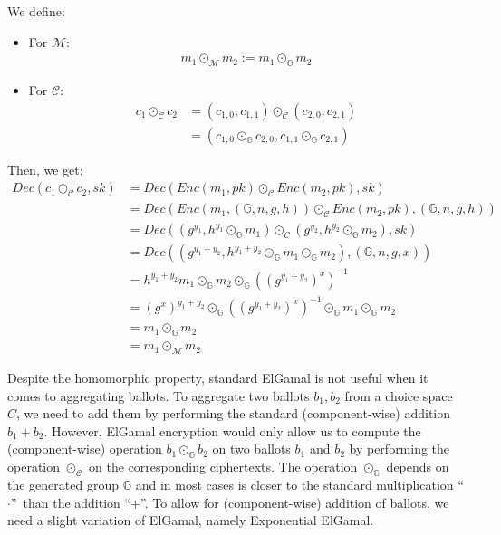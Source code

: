We define:
\begin{itemize}
    \item For $\mathcal{M}$:
    \begin{align*}
        m_1\odot_{\mathcal{M}}m_2 := m_1 \odot_{\mathbb{G}} m_2
    \end{align*}
    \item For $\mathcal{C}$:
    \begin{align*}
        c_1\odot_{\mathcal{C}}c_2 &= (c_{1,0}, c_{1,1})\odot_\mathcal{C} (c_{2,0}, c_{2,1})\\
        &= (c_{1,0}\odot_\mathbb{G} c_{2,0}, c_{1,1}\odot_\mathbb{G} c_{2,1})
    \end{align*}
\end{itemize}

Then, we get:
\begin{align*}
    Dec(c_1 \odot_{\mathcal{C}} c_2, sk) & = Dec(Enc(m_1, pk)\odot_{\mathcal{C}} Enc(m_2, pk), sk)\\
    & = Dec(Enc(m_1, (\mathbb{G}, n, g, h))\odot_{\mathcal{C}} Enc(m_2, pk), (\mathbb{G}, n, g ,h))\\
    & = Dec((g^{y_1}, h^{y_1}\odot_{\mathbb{G}}m_1)\odot_{\mathcal{C}} (g^{y_2}, h^{y_2}\odot_{\mathbb{G}}m_2), sk)\\
    & = Dec((g^{y_1+y_2}, h^{y_1+y_2}\odot_{\mathbb{G}}m_1\odot_{\mathbb{G}} m_2), (\mathbb{G}, n, g, x))\\
    & = h^{y_1+y_2}m_1\odot_{\mathbb{G}} m_2 \odot_{\mathbb{G}} ((g^{y_1+y_2})^x)^{-1}\\
    & = (g^x)^{y_1+y_2}\odot_{\mathbb{G}} ((g^{y_1+y_2})^x)^{-1}\odot_{\mathbb{G}} m_1\odot_{\mathbb{G}} m_2\\
    & = m_1\odot_{\mathbb{G}} m_2\\
    & = m_1\odot_{\mathcal{M}}m_2
\end{align*}

Despite the homomorphic property, standard ElGamal is not useful when it comes to aggregating ballots.
To aggregate two ballots $b_1, b_2$ from a choice space $C$, we need to add them by performing the standard (component-wise) addition $b_1+b_2$.
However, ElGamal encryption would only allow us to compute the (component-wise) operation $b_1\odot_{\mathbb{G}} b_2$ on two ballots $b_1$ and $b_2$ by performing the operation $\odot_\mathcal{C}$ on the corresponding ciphertexts.
The operation $\odot_{\mathbb{G}}$ depends on the generated group $\mathbb{G}$ and in most cases is closer to the standard multiplication ``$\cdot$''\ than the addition ``$+$''.
To allow for (component-wise) addition of ballots, we need a slight variation of ElGamal, namely Exponential ElGamal.

